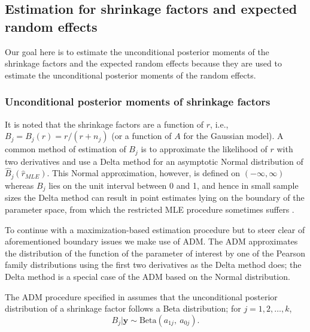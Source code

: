 \documentclass[article]{jss}
\begin{document}
\subsection[shrinkage]{Estimation for shrinkage factors and expected random effects}\label{shrinkage}

Our goal here is to estimate the unconditional posterior moments of the shrinkage factors and the expected random effects because they are used to estimate the unconditional posterior moments of the random effects. 

\subsubsection{Unconditional posterior moments of shrinkage factors}  It is noted that  the shrinkage factors  are a function of $r$, i.e., $B_{j}= B_{j}(r)=r/(r+n_{j})$ (or a function of $A$ for the Gaussian model). A common method of estimation of $B_{j}$ is to approximate the likelihood of $r$ with two derivatives and use  a Delta method for an asymptotic Normal distribution of $\hat{B}_{j}(\hat{r}_{MLE})$. This Normal approximation, however, is defined on $(-\infty, \infty)$ whereas $B_{j}$ lies on the unit interval between 0 and 1, and hence in small sample sizes the Delta method can result in point estimates lying on the boundary of the parameter space, from which the restricted MLE procedure sometimes suffers \citep{tang2011, kelly2014advances}.

To continue with a maximization-based estimation procedure but to steer clear of aforementioned boundary issues we make use of  ADM. The ADM approximates the distribution of the function of the parameter of interest by one of the Pearson family distributions using the first two derivatives as the Delta method does; the Delta method is a special case of the ADM based on the Normal distribution. 


The ADM procedure specified in \cite{tang2011} assumes that the unconditional posterior distribution of a shrinkage factor follows a Beta distribution; for $j=1, 2, \ldots, k$,
\begin{equation}\label{admshrinkage}
B_j\vert\boldsymbol{y}\sim \textrm{Beta}(a_{1j},~ a_{0j}).
\end{equation}
\end{document}
